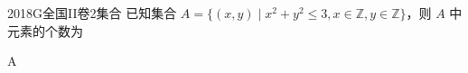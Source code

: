 
\begin{problem}{2018}{G}{全国II卷}{2}{集合}
已知集合 $ A=\{(x,y)\mid x^2+y^2\leq 3, x\in\mathbb{Z}, y\in\mathbb{Z}\} $，则 $ A $ 中元素的个数为
\begin{choices}
\end{choices}
\end{problem}

\begin{answer}
A
\end{answer}

\begin{solutions}

\end{solutions}